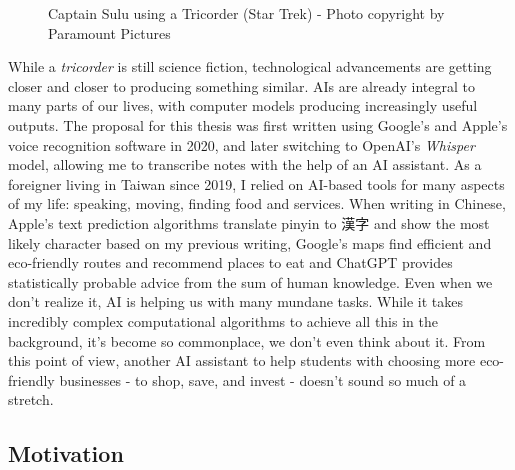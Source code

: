 \documentclass[
  12pt,
  letterpaper,
  DIV=11,
  numbers=noendperiod]{scrartcl}
\begin{document}
\begin{figure}


\caption{\label{fig-co2-tricorder}Captain Sulu using a Tricorder (Star
Trek) - Photo copyright by Paramount Pictures}

\end{figure}%

While a \emph{tricorder} is still science fiction, technological
advancements are getting closer and closer to producing something
similar. AIs are already integral to many parts of our lives, with
computer models producing increasingly useful outputs. The proposal for
this thesis was first written using Google's and Apple's voice
recognition software in 2020, and later switching to OpenAI's
\emph{Whisper} model, allowing me to transcribe notes with the help of
an AI assistant. As a foreigner living in Taiwan since 2019, I relied on
AI-based tools for many aspects of my life: speaking, moving, finding
food and services. When writing in Chinese, Apple's text prediction
algorithms translate pinyin to 漢字 and show the most likely character
based on my previous writing, Google's maps find efficient and
eco-friendly routes and recommend places to eat and ChatGPT provides
statistically probable advice from the sum of human knowledge. Even when
we don't realize it, AI is helping us with many mundane tasks. While it
takes incredibly complex computational algorithms to achieve all this in
the background, it's become so commonplace, we don't even think about
it. From this point of view, another AI assistant to help students with
choosing more eco-friendly businesses - to shop, save, and invest -
doesn't sound so much of a stretch.

\subsection{Motivation}\label{motivation}
\end{document}
